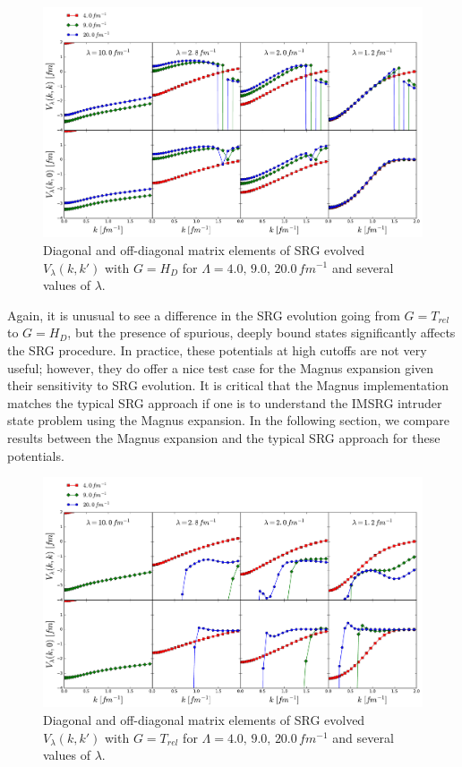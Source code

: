 \documentclass[preprintnumbers,floatfix,aps,prc,preprint]{revtex4-1}
\begin{document}
%
\begin{figure}[H]
  \centering
  \includegraphics[width=15cm]{srg_diags_offdiags_Wendt_Wegner}
   \hspace*{0.05\textwidth}%
  \caption{Diagonal and off-diagonal matrix elements of SRG evolved $V_{\lambda}(k,k')$ with $G=H_{D}$ for $\Lambda=4.0, \, 9.0, \, 20.0\,fm^{-1}$ and several values of $\lambda$.}
  \label{fig:srg_diags_offdiags_Wendt_Wegner}
\end{figure}
%
Again, it is unusual to see a difference in the SRG evolution going from $G=T_{rel}$ to $G=H_{D}$, but the presence of spurious, deeply bound states significantly affects the SRG procedure. In practice, these potentials at high cutoffs are not very useful; however, they do offer a nice test case for the Magnus expansion given their sensitivity to SRG evolution. It is critical that the Magnus implementation matches the typical SRG approach if one is to understand the IMSRG intruder state problem using the Magnus expansion. In the following section, we compare results between the Magnus expansion and the typical SRG approach for these potentials. \\
%
\begin{figure}[H]
  \centering
  \includegraphics[width=15cm]{srg_diags_offdiags_Wendt_Wilson}
   \hspace*{0.05\textwidth}%
  \caption{Diagonal and off-diagonal matrix elements of SRG evolved $V_{\lambda}(k,k')$ with $G=T_{rel}$ for $\Lambda=4.0, \, 9.0, \, 20.0\,fm^{-1}$ and several values of $\lambda$.}
  \label{fig:srg_diags_offdiags_Wendt_Wilson}
\end{figure}
\end{document}
